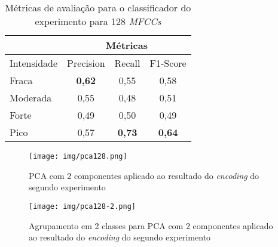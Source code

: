 \begin{table}%
    \centering
    \begin{tabular}{l|ccc|}
        \cline{2-4}
                                          & \multicolumn{3}{c|}{Métricas}                                                               \\ \hline
        \multicolumn{1}{|l|}{Intensidade} & \multicolumn{1}{c|}{Precision}      & \multicolumn{1}{c|}{Recall}           & F1-Score      \\ \hline
        \multicolumn{1}{|l|}{Fraca}       & \multicolumn{1}{c|}{\textbf{0,62}}  & \multicolumn{1}{c|}{0,55}             & 0,58          \\ \hline
        \multicolumn{1}{|l|}{Moderada}    & \multicolumn{1}{c|}{0,55}           & \multicolumn{1}{c|}{0,48}             & 0,51          \\ \hline
        \multicolumn{1}{|l|}{Forte}       & \multicolumn{1}{c|}{0,49}           & \multicolumn{1}{c|}{0,50}              & 0,49          \\ \hline
        \multicolumn{1}{|l|}{Pico}        & \multicolumn{1}{c|}{0,57}           & \multicolumn{1}{c|}{\textbf{0,73}}    & \textbf{0,64} \\ \hline
    \end{tabular}
        \caption{\label{table:metricasclf128}Métricas de avaliação para o classificador do experimento para 128 \textit{MFCCs}}
\end{table}

\begin{figure}%
    \centering
    \texttt{[image: img/pca128.png]}
    \caption{\label{fig:pca128}PCA com 2 componentes aplicado ao resultado do \textit{encoding} do segundo experimento}
\end{figure}

\begin{figure}%
    \centering
    \texttt{[image: img/pca128-2.png]}
    \caption{\label{fig:pca128-2}Agrupamento em 2 classes para PCA com 2 componentes aplicado ao resultado do \textit{encoding} do segundo experimento}
\end{figure}

